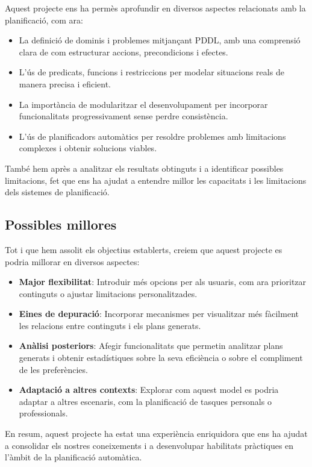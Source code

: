 \documentclass[a4paper]{article}
\begin{document}
	Aquest projecte ens ha permès aprofundir en diversos aspectes relacionats amb la planificació, com ara:
	\begin{itemize}
		\item La definició de dominis i problemes mitjançant PDDL, amb una comprensió clara de com estructurar accions, precondicions i efectes.
		\item L'ús de predicats, funcions i restriccions per modelar situacions reals de manera precisa i eficient.
		\item La importància de modularitzar el desenvolupament per incorporar funcionalitats progressivament sense perdre consistència.
		\item L'ús de planificadors automàtics per resoldre problemes amb limitacions complexes i obtenir solucions viables.
	\end{itemize}
	
	També hem après a analitzar els resultats obtinguts i a identificar possibles limitacions, fet que ens ha ajudat a entendre millor les capacitats i les limitacions dels sistemes de planificació.
	
	
	\subsection{Possibles millores}	

	Tot i que hem assolit els objectius establerts, creiem que aquest projecte es podria millorar en diversos aspectes:
	\begin{itemize}
		\item \textbf{Major flexibilitat}: Introduir més opcions per als usuaris, com ara prioritzar continguts o ajustar limitacions personalitzades.
		\item \textbf{Eines de depuració}: Incorporar mecanismes per visualitzar més fàcilment les relacions entre continguts i els plans generats.
		\item \textbf{Anàlisi posteriors}: Afegir funcionalitats que permetin analitzar plans generats i obtenir estadístiques sobre la seva eficiència o sobre el compliment de les preferències.
		\item \textbf{Adaptació a altres contexts}: Explorar com aquest model es podria adaptar a altres escenaris, com la planificació de tasques personals o professionals.
	\end{itemize}
	
	En resum, aquest projecte ha estat una experiència enriquidora que ens ha ajudat a consolidar els nostres coneixements i a desenvolupar habilitats pràctiques en l'àmbit de la planificació automàtica.	
	
\end{document}

